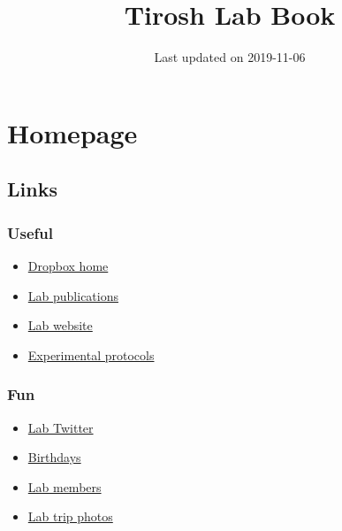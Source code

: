 \documentclass[]{book}
\title{Tirosh Lab Book}
\author{}
\date{Last updated on 2019-11-06}
\providecommand{\tightlist}{%
  \setlength{\itemsep}{0pt}\setlength{\parskip}{0pt}}
\begin{document}
\maketitle

{
\setcounter{tocdepth}{1}
\tableofcontents
}
\chapter{Homepage}\label{homepage}

\section{Links}\label{links}

\subsection{Useful}\label{useful}

\begin{itemize}
\tightlist
\item
  \href{https://www.dropbox.com/home/Tirosh\%20Lab}{Dropbox home}\\
\item
  \href{http://www.weizmann.ac.il/mcb/tirosh/publications-0}{Lab
  publications}\\
\item
  \href{http://www.weizmann.ac.il/mcb/tirosh/}{Lab website}\\
\item
  \href{https://www.dropbox.com/sh/javjoi26i5k5f6t/AADAX4RgSZUFuBwtS6TRE3wua?dl=0}{Experimental
  protocols}
\end{itemize}

\subsection{Fun}\label{fun}

\begin{itemize}
\tightlist
\item
  \href{https://twitter.com/tiroshlab?lang=bg}{Lab Twitter}\\
\item
  \href{https://www.dropbox.com/s/zwss5fg9rkoz7pp/lab\%20bday\%20list.xlsx?dl=0}{Birthdays}\\
\item
  \href{http://www.weizmann.ac.il/mcb/tirosh/group-members}{Lab
  members}\\
\item
  \href{http://www.weizmann.ac.il/mcb/tirosh/pictures}{Lab trip photos}
\end{itemize}
\end{document}
